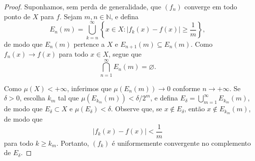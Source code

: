 \begin{proof}
    Suponhamos, sem perda de generalidade, que $(f_n)$ converge em todo ponto de $X$ para $f$. Sejam $m, n \in \mathbb{N}$, e defina
    \begin{equation*}
        E_n(m) = \bigcup_{k=n}^{\infty} \left\{ x \in X : |f_k(x) - f(x)| \geq \frac{1}{m} \right\},
    \end{equation*}
    de modo que $E_n(m)$ pertence a $X$ e $E_{n+1}(m) \subseteq E_n(m)$. Como $f_n(x) \to f(x)$ para todo $x \in X$, segue que
    \begin{equation*}
        \bigcap_{n=1}^{\infty} E_n(m) = \varnothing.
    \end{equation*}

    Como $\mu(X) < +\infty$, inferimos que $\mu(E_n(m)) \to 0$ conforme $n \to +\infty$. Se $\delta > 0$, escolha $k_m$ tal que $\mu(E_{k_m}(m)) < \delta / 2^m$, e defina $E_\delta = \bigcup_{m=1}^{\infty} E_{k_m}(m)$, de modo que $E_\delta \subset X$ e $\mu(E_\delta) < \delta$. Observe que, se $x \notin E_\delta$, então $x \notin E_{k_m}(m)$, de modo que
    \begin{equation*}
        |f_k(x) - f(x)| < \frac{1}{m}
    \end{equation*}
    para todo $k \geq k_m$. Portanto, $(f_k)$ é uniformemente convergente no complemento de $E_\delta$.
\end{proof}
